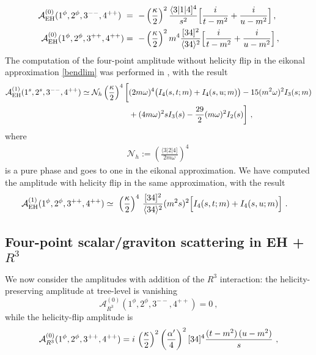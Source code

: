 \documentclass[a4paper,11pt]{article}
\numberwithin{equation}{section}
\newcommand{\agl}[2]{\langle#1 #2 \rangle}
\newcommand{\sqr}[2]{\lbrack #1 #2 \rbrack}
\newcommand{\cN}{\mathcal{N}}
\begin{document}
\begin{equation}
    \label{eq:ssgg_tree}
    \begin{split}
        \mathcal{A}_{\rm EH}^{(0)} (1^\phi, 2^\phi, 3^{--}, 4^{++}) \ & = \ - 
        \left({\kappa\over 2}\right)^2 
        {\langle 3 | 1 | 4]^4\over s^2} \Big[ {i\over t-m^2} + {i\over u - m^2} \Big]\, , 
        \\
        \mathcal{A}_{\rm EH}^{(0)} (1^\phi, 2^\phi, 3^{++}, 4^{++}) & = \ - 
        \left({\kappa\over 2}\right)^2 
        m^4 {[34]^2\over \langle 34\rangle^2} \Big[ {i\over t-m^2} + {i\over u - m^2} \Big]\, , 
    \end{split}
\end{equation} 
The computation of the four-point amplitude without helicity flip in the eikonal approximation \eqref{bendlim}  was performed in 
 \cite{Chi:2019owc}, with the result
\begin{align}
    \label{Chi}
    \begin{split}
        \mathcal{A}_{\rm EH}^{(1)}  (1^s, 2^s, 3^{--}, 4^{++})  \simeq \cN_h \left( \frac{\kappa}{2}\right)^4 \bigg[ & (2 m \omega)^4 \big( I_4(s, t; m) + I_4 (s, u; m)\big) - 15 ( m^2 \omega)^2 I_3(s; m)
        \\ & +(4 m \omega)^2 s I_3(s)  - {29\over 2} (m \omega)^2 I_2 (s) \bigg]\ , 
    \end{split}
\end{align}
where 
\begin{align}
\label{enneacca}
\cN_h := \left( \frac{\langle 3| 2| 4]}{2 m \omega}\right)^4
\ 
\end{align}
is a pure phase and goes to one in the eikonal approximation. 
We have computed the amplitude with helicity flip in the same approximation, with the result 
\begin{align}
    \label{EHflip}
    \mathcal{A}_{\rm EH}^{(1)} (1^\phi, 2^\phi, 3^{++}, 4^{++}) & \simeq \ \left( \frac{\kappa}{2} \right)^4 \, \frac{\sqr{3}{4}^2}{\agl{3}{4}^2} (m^2 s)^2  \Big[ I_4(s, t;m) + I_4 (s, u;m)\Big] \ . 
\end{align}

\subsection{Four-point scalar/graviton scattering in EH + \texorpdfstring{$R^3$}{R3}}
We now consider the amplitudes with addition of the $R^3$ interaction: the helicity-preserving amplitude at tree-level is vanishing
\begin{equation}
    \mathcal{A}_{R^3}^{(0)} (1^\phi, 2^\phi, 3^{--}, 4^{++}) = 0\ ,
\end{equation}
while the helicity-flip amplitude is
\begin{equation}
    \mathcal{A}_{R^3}^{(0)} (1^\phi, 2^\phi, 3^{++}, 4^{++}) = i \, 
    \left({\kappa\over 2}\right)^2 \left({\alpha^\prime\over 4}\right)^2 
     [34]^4\frac{(t-m^2)\, (u-m^2)}{s} \ , 
\end{equation}
\end{document}
